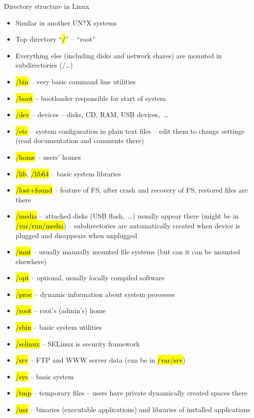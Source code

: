 \documentclass[compress, ucs, xelatex, 11pt, xcolor=svgnames,
  hyperref={
    bookmarks=true,
    unicode=true,
    colorlinks=true,
    pdftitle={Linux, command line and MetaCentrum},
    plainpages=false,
    pdfauthor={Vojtech Zeisek},
    pdfsubject={Course about use of Linux command line, writing shell scripts and using MetaCentrum of CESNET},
    pdfcreator={XeLaTeX},
    pdfkeywords={Linux, GNU, BASH, shell, command line, MetaCentrum},
    linkcolor=Red,
    anchorcolor=Blue,
    citecolor=Purple,
    filecolor=DodgerBlue,
    menucolor=DarkOrchid,
    urlcolor=DeepSkyBlue,
    pdftex},
  url={hyphens, lowtilde} %
  ]{beamer}
\renewcommand{\texttt}[1]{\hl{\ttfamily #1}}
\renewcommand{\alert}[1]{\textcolor{red}{#1}}
\begin{document}
\begin{frame}[allowframebreaks]{Directory structure in Linux}
\begin{itemize}
  \item Similar in another UN*X systems
  \item Top directory ``\texttt{/}'' -- ``root''
  \item Everything else (including disks and network shares) are mounted in subdirectories (/\ldots)
  \item \texttt{/bin} -- very basic command line utilities
  \item \texttt{/boot} -- bootloader responsible for start of system
  \item \texttt{/dev} -- devices -- disks, CD, RAM, USB devices,~\ldots
  \item \alert{\texttt{/etc}} -- system configuration in plain text files -- edit them to change settings (read documentation and comments there)
  \item \alert{\texttt{/home}} -- users' homes
  \item \texttt{/lib}, \texttt{/lib64} -- basic system libraries
  \item \texttt{/lost+found} -- feature of FS, after crash and recovery of FS, restored files are there
  \item \alert{\texttt{/media}} -- attached disks (USB flash,~\ldots) usually appear there (might be in \texttt{/var/run/media}) -- subdirectories are automatically created when device is plugged and disappears when unplugged
  \item \texttt{/mnt} -- usually manually mounted file systems (but can it can be mounted elsewhere)
  \item \texttt{/opt} -- optional, usually locally compiled software
  \item \texttt{/proc} -- dynamic information about system processes
  \item \texttt{/root} -- root's (admin's) home
  \item \texttt{/sbin} -- basic system utilities
  \item \texttt{/selinux} -- SELinux is security framework
  \item \texttt{/srv} -- FTP and WWW server data (can be in \texttt{/var/srv})
  \item \texttt{/sys} -- basic system
  \item \texttt{/tmp} -- temporary files -- users have private dynamically created spaces there
  \item \texttt{/usr} -- binaries (executable applications) and libraries of installed applications

\end{itemize}
\end{frame}
\end{document}
